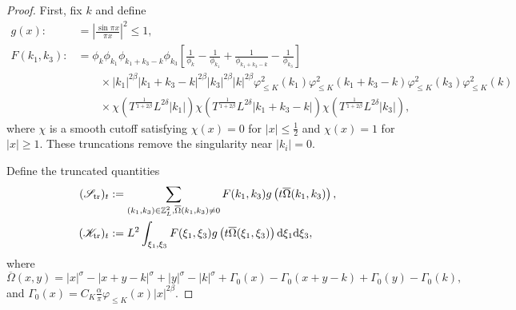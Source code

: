 \documentclass[UTF-8,reqno]{amsart}
\numberwithin{equation}{section}
\theoremstyle{definition}
\def\dif{{\mathord{{\rm d}}}}
\def\geq{\geqslant}
\def\leq{\leqslant}
\def\dif{{\mathord{{\rm d}}}}
\def\geq{\geqslant}
\def\leq{\leqslant}
\begin{document}
\begin{proof}
First, fix $k$ and define \begin{align*}
    g(x):&=\left|\frac{\sin \pi x}{\pi x}\right|^2\leq 1,\\
    F(k_1,k_3):&=\phi_k \phi_{k_1} \phi_{k_1+k_3-k} \phi_{k_3}  \left[ \frac{1}{\phi_k} - \frac{1}{\phi_{k_1}} + \frac{1}{\phi_{k_1+k_3-k}} - \frac{1}{\phi_{k_3}} \right]\\
    &\quad\quad\times
 |k_1|^{2\beta}|k_1+k_3-k|^{2\beta}|k_3|^{2\beta}|k|^{2\beta}\varphi_{\leq K}^2(k_1)\varphi_{\leq K}^2(k_1+k_3-k)\varphi_{\leq K}^2(k_3)\varphi_{\leq K}^2(k)\\
 &\quad\quad \times \chi(T^{\frac{1}{1+2\beta}}L^{2\delta}|k_1|)\chi(T^{\frac{1}{1+2\beta}}L^{2\delta}|k_1+k_3-k|)\chi(T^{\frac{1}{1+2\beta}}L^{2\delta}|k_3|),
\end{align*}
where   $\chi$ is a smooth cutoff satisfying $\chi(x)=0$ for $|x|\leq \frac12$ and $\chi(x)=1$ for $|x|\geq 1$. These truncations remove the singularity near $|k_i|=0$. 

Define the truncated quantities
\begin{align*}
   (\mathscr S_{\rm tr})_t&:=\sum_{(k_1, k_3)\in \mathbb{Z}_L^{2},\overline\Omega(k_1,k_3)\neq 0}F(k_1,k_3) g\left(t\overline \Omega(k_1,k_3)\right),\\
 (\mathscr K_{\rm tr})_t&:=L^{2} \int_{\xi_1,\xi_3}F(\xi_1,\xi_3) g\left(t\overline \Omega(\xi_1,\xi_3)\right)\dif \xi_1\dif \xi_3,
\end{align*}
where
$$\overline\Omega(x,y) =|x|^\sigma-|x+y-k|^\sigma+|y|^\sigma-|k|^\sigma+\Gamma_0(x)-\Gamma_0(x+y-k)+\Gamma_0(y)-\Gamma_0(k),$$
and
$ \Gamma_0(x)=C_K\frac{\alpha }{\pi }\varphi_{\leq K}(x)|x|^{2\beta}.$


\end{proof}
\end{document}
